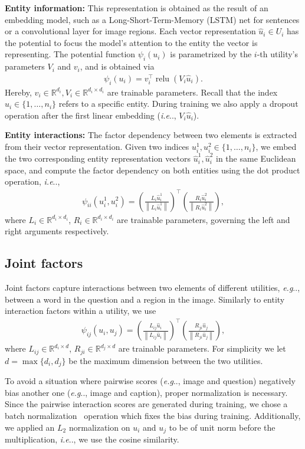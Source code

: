 \documentclass[10pt,twocolumn,letterpaper]{article}
\makeatletter
\newcommand{\beas}{\begin{eqnarray*}}
\newcommand{\eeas}{\end{eqnarray*}}
\newcommand{\norm}[1]{\left\lVert#1\right\rVert}
\def\@onedot{\ifx\@let@token.\else.\null\fi\xspace}
\DeclareRobustCommand\onedot{\futurelet\@let@token\@onedot}
\def\eg{\emph{e.g}\onedot} \def\Eg{\emph{E.g}\onedot}
\def\ie{\emph{i.e}\onedot} \def\Ie{\emph{I.e}\onedot}
\makeatother
\begin{document}
\noindent\textbf{Entity information:} 
This representation is obtained as the result of an embedding model, such as a Long-Short-Term-Memory (LSTM) net for sentences or a convolutional layer for image regions. Each vector representation $\hat u_i \in U_i $ has the potential to focus the model's attention to the entity the vector is representing. The potential function $\psi_i(u_i)$ is parametrized by the $i$-th utility's parameters ${V}_i$ and ${v}_i$, and is obtained via \beas
\psi_i(u_i)= v_i^\top  \operatorname{relu}(V_i \hat u_i).
\eeas
Hereby, $v_i \in \mathbb{R}^{d_i}, V_i \in\mathbb{R}^{d_i \times d_i}$ are trainable parameters. Recall that the index $u_i\in\{1, \ldots, n_i\}$ refers to  a specific entity. During training we also apply a dropout operation after the first linear embedding (\ie, 
$ V_i \hat u_i $). 

\noindent\textbf{Entity interactions:} The factor dependency between two elements is extracted from their vector representation. Given two indices $u_i^1, u_i^2 \in \{1, \ldots, n_i\}$, we embed the two corresponding entity representation vectors $\hat u_i^1, \hat u_i^2$ in the same Euclidean space, and  compute the factor dependency on both entities using the  dot product operation, \ie, 
\beas
\psi_{ii}(u_i^1, u_i^2)=  \left(\frac{L_{i} \hat u_i^1}{\norm{L_{i} \hat u_i^1}}\right)^\top  \left(\frac{R_{i} \hat u_i^2}{\norm{R_{i} \hat u_i^2}}\right),
\eeas
where $L_i \in \mathbb{R}^{d_i\times d_i}$, $R_{i} \in \mathbb{R}^{d_i \times d_i}$ are trainable parameters, governing the left and right arguments respectively. 



\subsection{Joint factors}
\label{sec:joint}
Joint factors capture interactions between two elements of different utilities, \eg, between a word in the question and a region in the image.  Similarly to entity interaction factors within a utility, we use
\beas
\psi_{ij}(u_i,u_j)= \left(\frac{L_{ij} \hat u_i}{\norm{L_{ij} \hat u_i}}\right)^\top  \left(\frac{R_{ji} \hat u_j}{\norm{R_{ji} \hat u_j}}\right),
\eeas
where $L_{ij} \in \mathbb{R}^{d_i \times d}$, $R_{ji} \in \mathbb{R}^{d_j \times d}$ are trainable parameters. For simplicity we let $d = \max\{d_i, d_j\}$  be the maximum dimension between the two utilities. 

To avoid a situation where pairwise scores (\eg, image and question) negatively bias another one (\eg, image and caption), proper normalization is necessary. Since the pairwise interaction scores  are generated during training, we chose a batch normalization~\cite{IoffeICML2015BatchNormalization} operation  which fixes the bias during training. Additionally, we applied an $L_2$ normalization on $u_i$ and $u_j$ to be of unit norm before the multiplication, \ie, we use the cosine similarity. 
\end{document}
